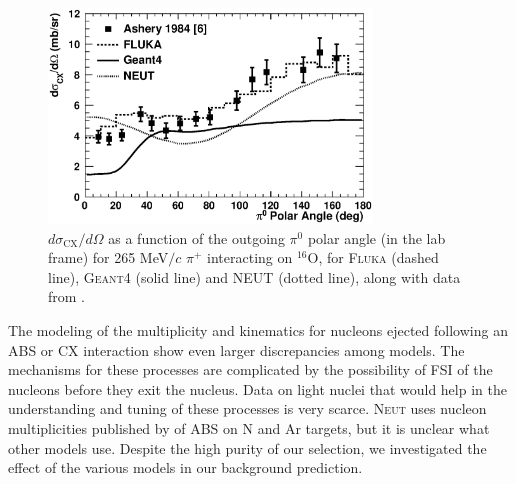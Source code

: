 \begin{figure}[h]
 \includegraphics[width=86mm]{figures/dsigma_cx_o16_data_and_models.eps}
 \caption{$d\sigma_{\mathrm{CX}}/d\Omega$ as a function of the outgoing $\pi^0$ polar angle (in the lab frame) for 265 MeV$/c$ $\pi^{+}$ interacting on $^{16}$O, for \textsc{Fluka} (dashed line), \textsc{Geant4} (solid line) and \textsc{NEUT} (dotted line), along with data from \cite{Ashery2}.}
 \label{fig:pi0kinem}
\end{figure}

The modeling of the multiplicity and kinematics for nucleons ejected following an ABS or CX interaction show even larger discrepancies among models. The mechanisms for these processes are complicated by the possibility of FSI of the nucleons before they exit the nucleus. Data on light nuclei that would help in the understanding and tuning of these processes is very scarce. \textsc{Neut} uses nucleon multiplicities published by \cite{Rowntree} of ABS on N and Ar targets, but it is unclear what other models use. Despite the high purity of our selection, we investigated the effect of the various models in our background prediction.


